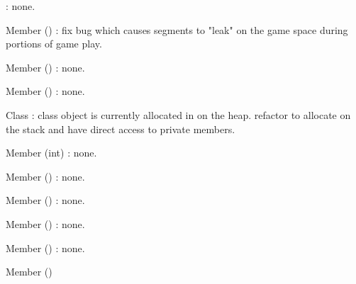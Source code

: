 \begin{DoxyRefList}
%
\+: none.  
\item[Member \doxylink{classbocan_1_1snake_1_1_game_a8cbe86d602a40868de18b46a521ff92c}{bocan\+::snake\+::Game\+::Move\+Snake} ()]\label{todo__todo000008}%
%
\+: fix bug which causes segments to "{}leak"{} on the game space during portions of game play.  
\item[Member \doxylink{classbocan_1_1snake_1_1_game_adb05b20574551a26f8cf1dc664782790}{bocan\+::snake\+::Game\+::Start} ()]\label{todo__todo000003}%
%
\+: none.  
\item[Member \doxylink{classbocan_1_1snake_1_1_game_ae3d112ca6e0e55150d2fdbc704474530}{bocan\+::snake\+::Game\+::\texorpdfstring{$\sim$}{\string~}\+Game} ()]\label{todo__todo000002}%
%
\+: none.  
\item[Class \doxylink{classbocan_1_1snake_1_1_printer}{bocan\+::snake\+::Printer} ]\label{todo__todo000029}%
%
\+: class object is currently allocated in  on the heap. refactor to allocate on the stack and have direct access to  private members.  
\item[Member \doxylink{classbocan_1_1snake_1_1_printer_ae0e1ccd27d1f955c139e9f2ee8c00c20}{bocan\+::snake\+::Printer\+::End\+Game} (int)]\label{todo__todo000020}%
%
\+: none.  
\item[Member \doxylink{classbocan_1_1snake_1_1_printer_a5a415acac8ecfddd9b33e8e575a611a1}{bocan\+::snake\+::Printer\+::End\+Screen} ()]\label{todo__todo000016}%
%
\+: none.  
\item[Member \doxylink{classbocan_1_1snake_1_1_printer_a628913c5a1765a013d3a5db4e7dba24a}{bocan\+::snake\+::Printer\+::Exit} ()]\label{todo__todo000022}%
%
\+: none.  
\item[Member \doxylink{classbocan_1_1snake_1_1_printer_a61286e700728df51cfd9ad4022763828}{bocan\+::snake\+::Printer\+::Get\+Direction} ()]\label{todo__todo000023}%
%
\+: none.  
\item[Member \doxylink{classbocan_1_1snake_1_1_printer_a9c251709156c2ff89d649d9f53864832}{bocan\+::snake\+::Printer\+::Pause} ()]\label{todo__todo000021}%
%
\+: none.  
\item[Member \doxylink{classbocan_1_1snake_1_1_printer_a1aba91ebff40aebda570d92f17f28b27}{bocan\+::snake\+::Printer\+::Printer} ()]\label{todo__todo000013}%

\end{DoxyRefList}
